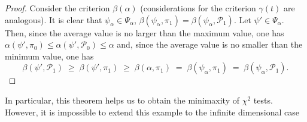 \begin{proof}
Consider the criterion $\beta(\alpha)$ (considerations for the criterion $\gamma(t)$ are
analogous). It is clear that $\psi_\alpha \in \Psi_\alpha$,
$\beta(\psi_\alpha, \pi_1) = \beta(\psi_\alpha, \mathcal{P}_1)$. Let $\psi' \in \Psi_\alpha$.
Then, since the average value is no larger than the maximum value, one has
$\alpha(\psi', \pi_0) \leq \alpha(\psi', \mathcal{P}_0) \leq \alpha$ and, since the
average value is no smaller than the minimum value, one has
\[
  \beta(\psi', \mathcal{P}_1) \;\geq\; \beta(\psi', \pi_1) \;\geq\; \beta(\alpha, \pi_1)
    \;=\; \beta(\psi_\alpha, \pi_1) \;=\; \beta(\psi_\alpha, \mathcal{P}_1).
\]
\end{proof}
In particular, this theorem helps us to obtain the minimaxity of $\chi^2$ tests. However, it is impossible to extend this example to the infinite dimensional case
